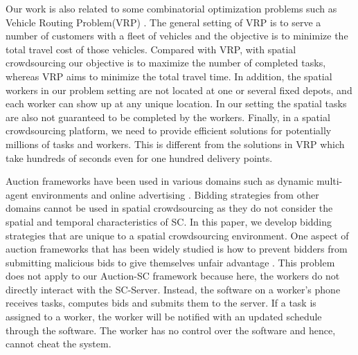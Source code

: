 Our work is also related to some combinatorial optimization problems such as Vehicle Routing Problem(VRP) \cite{Braysy05}. The general setting of VRP is to serve a number of customers with a fleet of vehicles and the objective is to minimize the total travel cost of those vehicles. Compared with VRP, with spatial crowdsourcing our objective is to maximize the number of completed tasks, whereas VRP aims to minimize the total travel time. In addition, the spatial workers in our problem setting are not located at one or several fixed depots, and each worker can show up at any unique location. In our setting the spatial tasks are also not guaranteed to be completed by the workers. Finally, in a spatial crowdsourcing platform, we need to provide efficient solutions for potentially millions of tasks and workers. This is different from the solutions in VRP which take hundreds of seconds even for one hundred delivery points.

Auction frameworks have been used in various domains such as dynamic multi-agent environments \cite{Mehta05,Lagoudakis04} and online advertising \cite{Ghosh10}. Bidding strategies from other domains cannot be used in spatial crowdsourcing as they do not consider the spatial and temporal characteristics of SC. In this paper, we develop bidding strategies that are unique to a spatial crowdsourcing environment. One aspect of auction frameworks that has been widely studied is how to prevent bidders from submitting malicious bids to give themselves unfair advantage \cite{Lavi05}. This problem does not apply to our Auction-SC framework because here, the workers do not directly interact with the SC-Server. Instead, the software on a worker's phone receives tasks, computes bids and submits them to the server. If a task is assigned to a worker, the worker will be notified with an updated schedule through the software. The worker has no control over the software and hence, cannot cheat the system.


